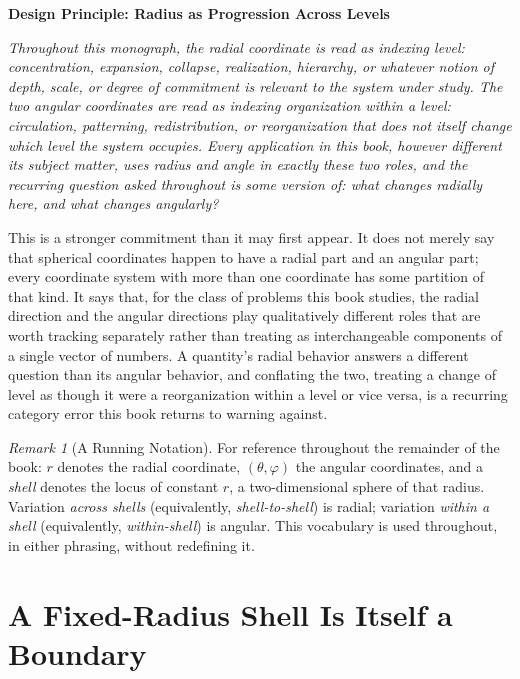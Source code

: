 \documentclass[11pt,fleqn]{book}
\numberwithin{equation}{chapter}
\newenvironment{principle}[1]
  {\begin{principleEnv}
   \noindent\textbf{Design Principle: #1}\par\smallskip\itshape}
  {\end{principleEnv}}
\theoremstyle{plain}
\theoremstyle{definition}
\theoremstyle{remark}
\newtheorem{remark}[theorem]{Remark}
\begin{document}
\begin{principle}{Radius as Progression Across Levels}
Throughout this monograph, the radial coordinate is read as indexing \emph{level}: concentration, expansion, collapse, realization, hierarchy, or whatever notion of depth, scale, or degree of commitment is relevant to the system under study. The two angular coordinates are read as indexing \emph{organization within a level}: circulation, patterning, redistribution, or reorganization that does not itself change which level the system occupies. Every application in this book, however different its subject matter, uses radius and angle in exactly these two roles, and the recurring question asked throughout is some version of: what changes radially here, and what changes angularly?
\end{principle}

This is a stronger commitment than it may first appear. It does not merely say that spherical coordinates happen to have a radial part and an angular part; every coordinate system with more than one coordinate has some partition of that kind. It says that, for the class of problems this book studies, the radial direction and the angular directions play qualitatively different roles that are worth tracking separately rather than treating as interchangeable components of a single vector of numbers. A quantity's radial behavior answers a different question than its angular behavior, and conflating the two, treating a change of level as though it were a reorganization within a level or vice versa, is a recurring category error this book returns to warning against.

\begin{remark}[A Running Notation]
For reference throughout the remainder of the book: \(r\) denotes the radial coordinate, \((\theta,\varphi)\) the angular coordinates, and a \emph{shell} denotes the locus of constant \(r\), a two-dimensional sphere of that radius. Variation \emph{across shells} (equivalently, \emph{shell-to-shell}) is radial; variation \emph{within a shell} (equivalently, \emph{within-shell}) is angular. This vocabulary is used throughout, in either phrasing, without redefining it.
\end{remark}

\section{A Fixed-Radius Shell Is Itself a Boundary}
\end{document}
